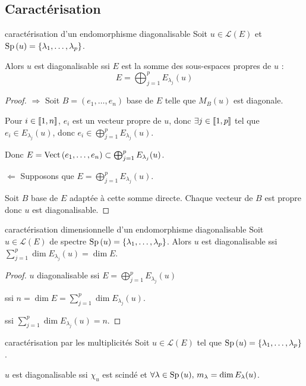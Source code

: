 \subsection{Caractérisation}

\begin{theoreme}{caractérisation d'un endomorphisme diagonalisable}{}
    Soit $u \in \mathscr L(E)$ et $\operatorname{Sp} \,(u) = \{\lambda_1, \ldots, \lambda_p\}$.

    Alors $u$ est diagonalisable ssi $E$ est la somme des sous-espaces propres de $u$ :
    $$E = \bigoplus_{j = 1 }^{ p } E_{\lambda_j}(u)$$
\end{theoreme}


\begin{proof}
    $\Rightarrow$ Soit $B = (e_1, \ldots, e_n)$ base de $E$ telle que $M_B(u)$ est diagonale.

    Pour $i \in [\![1, n]\!]$, $e_i$ est un vecteur propre de $u$, donc $\exists j \in [\![1, p]\!]$
    tel que $e_i \in E_{\lambda_j}(u)$, donc $e_i \in \bigoplus_{j = 1 }^{ p } E_{\lambda_j}(u)$.

    Donc $E = \operatorname{Vect} \,(e_1, \ldots, e_n) \subset \bigoplus_{j = 1 }^{ p } E_{\lambda_j}(u)$.

    \lvspace $\Leftarrow$ Supposons que $\displaystyle E = \bigoplus_{j = 1 }^{ p } E_{\lambda_j}(u)$.

    Soit $B$ base de $E$ adaptée à cette somme directe. Chaque vecteur de $B$ est propre donc 
    $u$ est diagonalisable.
\end{proof}

\begin{corollairent}{caractérisation dimensionnelle d'un endomorphisme diagonalisable}{}
    Soit $u \in \mathscr L(E)$ de spectre $\operatorname{Sp} \,(u) = \{\lambda_1, \ldots, \lambda_p\}$.
    Alors $u$ est diagonalisable ssi $\displaystyle \sum_{j = 1 }^{p } \dim E_{\lambda_j}(u) = \dim E$.
\end{corollairent}

\begin{proof}
    $u$ diagonalisable ssi $\displaystyle E = \bigoplus_{j = 1 }^{ p } E_{\lambda_j}(u)$
    
    ssi $\displaystyle n = \dim E = \sum_{j = 1 }^{ p } \dim E_{\lambda_j}(u)$.

    ssi $\displaystyle \sum_{j = 1 }^{ p } \dim E_{\lambda_j}(u) = n$.
\end{proof}


\begin{theoreme}{caractérisation par les multiplicités}{}
    Soit $u \in \mathscr L(E)$ tel que $\operatorname{Sp} \,(u) = \{\lambda_1, \ldots, \lambda_p\}$.

    $u$ est diagonalisable ssi $\chi_u$ est scindé et $\forall \lambda \in \operatorname{Sp} \,(u), \, m_\lambda = \dim E_\lambda(u)$.
\end{theoreme}

